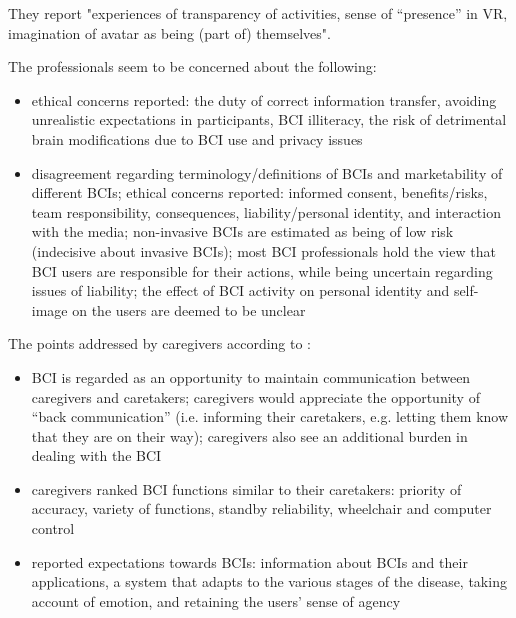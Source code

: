 \documentclass[fleqn,11pt]{olplainarticle}
\begin{document}
They report "experiences of transparency of activities, sense of “presence” in VR, imagination of avatar as being (part of) themselves".

The professionals seem to be concerned about the following:
\begin{itemize}
    \item ethical concerns reported: the duty of correct information transfer, avoiding unrealistic expectations in participants, BCI illiteracy, the risk of detrimental brain modifications due to BCI use and privacy issues
    \item disagreement regarding terminology/definitions of BCIs and marketability of different BCIs; ethical concerns reported: informed consent, benefits/risks, team responsibility, consequences, liability/personal identity, and interaction with the media; non-invasive BCIs are estimated as being of low risk (indecisive about invasive BCIs); most BCI professionals hold the view that BCI users are responsible for their actions, while being uncertain regarding issues of liability; the effect of BCI activity on personal identity and self-image on the users are deemed to be unclear
\end{itemize}

The points addressed by caregivers according to \cite{kogel2019using}:
\begin{displayquote}
    \begin{itemize}
        \item BCI is regarded as an opportunity to maintain communication between caregivers and caretakers; caregivers would appreciate the opportunity of “back communication” (i.e. informing their caretakers, e.g. letting them know that they are on their way); caregivers also see an additional burden in dealing with the BCI
        \item caregivers ranked BCI functions similar to their caretakers: priority of accuracy, variety of functions, standby reliability, wheelchair and computer control
        \item reported expectations towards BCIs: information about BCIs and their applications, a system that adapts to the various stages of the disease, taking account of emotion, and retaining the users’ sense of agency
    \end{itemize}
\end{displayquote}
\end{document}
